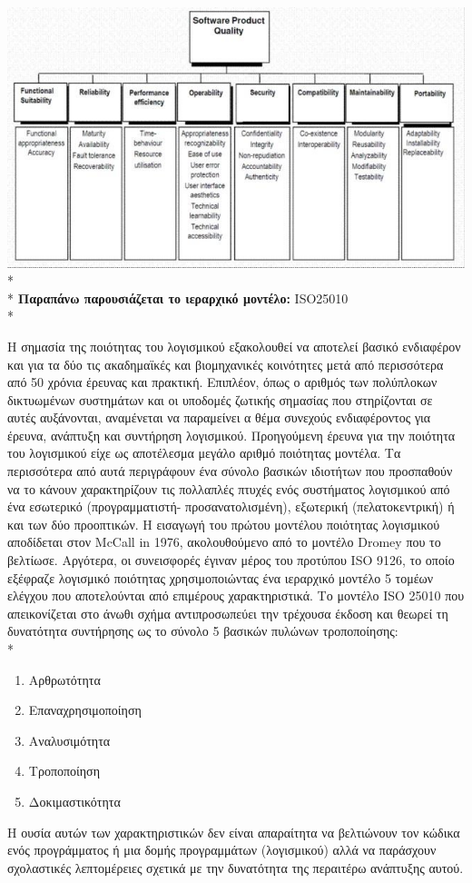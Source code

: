\documentclass[a4paper, 11pt]{article}
\begin{document}
{{\includegraphics{images/ISO25010.jpg}\\*
\\*
\textbf{Παραπάνω παρουσιάζεται το ιεραρχικό μοντέλο: }
\textlatin{ISO25010}\\*

Η σημασία της ποιότητας του λογισμικού εξακολουθεί να αποτελεί βασικό ενδιαφέρον και για τα δύο
τις ακαδημαϊκές και βιομηχανικές κοινότητες μετά από περισσότερα από 50 χρόνια έρευνας
και πρακτική. Επιπλέον, όπως ο αριθμός των πολύπλοκων δικτυωμένων συστημάτων και
οι υποδομές ζωτικής σημασίας που στηρίζονται σε αυτές αυξάνονται, αναμένεται να παραμείνει α
θέμα συνεχούς ενδιαφέροντος για έρευνα, ανάπτυξη και συντήρηση λογισμικού.
Προηγούμενη έρευνα για την ποιότητα του λογισμικού είχε ως αποτέλεσμα μεγάλο αριθμό ποιότητας
μοντέλα. Τα περισσότερα από αυτά περιγράφουν ένα σύνολο βασικών ιδιοτήτων που προσπαθούν να το κάνουν
χαρακτηρίζουν τις πολλαπλές πτυχές ενός συστήματος λογισμικού από ένα εσωτερικό (προγραμματιστή-
προσανατολισμένη), εξωτερική (πελατοκεντρική) ή και των δύο προοπτικών.
Η εισαγωγή του πρώτου μοντέλου ποιότητας λογισμικού αποδίδεται στον \textlatin{McCall} in
1976, ακολουθούμενο από το μοντέλο \textlatin{Dromey} που το βελτίωσε. Αργότερα,
οι συνεισφορές έγιναν μέρος του προτύπου  \textlatin{ISO 9126}, το οποίο εξέφραζε λογισμικό
ποιότητας χρησιμοποιώντας ένα ιεραρχικό μοντέλο 5 τομέων ελέγχου που αποτελούνται από επιμέρους χαρακτηριστικά. Το μοντέλο  \textlatin{ISO 25010} που απεικονίζεται στο άνωθι σχήμα αντιπροσωπεύει την τρέχουσα έκδοση και θεωρεί τη δυνατότητα συντήρησης ως το σύνολο 5 βασικών
πυλώνων τροποποίησης: \\*
\begin{enumerate}
\item Αρθρωτότητα
\item Επαναχρησιμοποίηση
\item Αναλυσιμότητα
\item  Τροποποίηση
\item Δοκιμαστικότητα
\end{enumerate}
Η ουσία αυτών των χαρακτηριστικών δεν είναι απαραίτητα να βελτιώνουν τον κώδικα ενός προγράμματος ή μια δομής προγραμμάτων (λογισμικού) αλλά να παράσχουν σχολαστικές λεπτομέρειες σχετικά με την δυνατότητα της περαιτέρω ανάπτυξης αυτού.

}}
\end{document}
